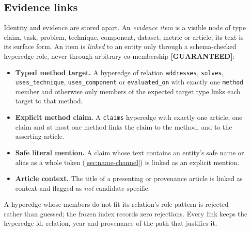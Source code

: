 \documentclass[11pt,a4paper]{article}
\newcommand{\cref}[1]{\autoref{#1}}
\theoremstyle{remark}
\newcommand{\code}[1]{\texttt{\small #1}}
\newcommand{\vtag}[2]{{\sffamily\scriptsize\bfseries\textcolor{#1}{[#2]}}}
\newcommand{\Gtag}{\vtag{accent}{GUARANTEED}}
\begin{document}
\subsection{Evidence links}
\label{sec:evidence-links}

Identity and evidence are stored apart. An \emph{evidence item} is a visible node of type
claim, task, problem, technique, component, dataset, metric or article; its text is its
surface form. An item is \emph{linked} to an entity only through a schema-checked
hyperedge role, never through arbitrary co-membership \Gtag:

\begin{itemize}
  \item \textbf{Typed method target.} A hyperedge of relation \code{addresses},
        \code{solves}, \code{uses\_technique}, \code{uses\_component} or
        \code{evaluated\_on} with exactly one \code{method} member and otherwise only
        members of the expected target type links each target to that method.
  \item \textbf{Explicit method claim.} A \code{claims} hyperedge with exactly one
        article, one claim and at most one method links the claim to the method, and to
        the asserting article.
  \item \textbf{Safe literal mention.} A claim whose text contains an entity's safe name
        or alias as a whole token (\cref{sec:name-channel}) is linked as an explicit
        mention.
  \item \textbf{Article context.} The title of a presenting or provenance article is
        linked as context and flagged as \emph{not} candidate-specific.
\end{itemize}
A hyperedge whose members do not fit its relation's role pattern is rejected rather than
guessed; the frozen index records zero rejections. Every link keeps the hyperedge id,
relation, year and provenance of the path that justifies it.
\end{document}
